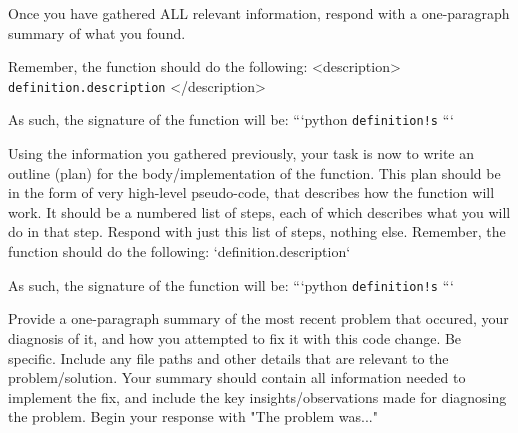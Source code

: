 \begin{tcolorbox}[title={\texttt{Explore Repository User Instructions}}]
Once you have gathered ALL relevant information, respond with a one-paragraph summary of what you found.

Remember, the function should do the following:
<description>
\texttt{{definition.description}}
</description>

As such, the signature of the function will be:
```python
\texttt{{definition!s}}
```
\end{tcolorbox}

\begin{tcolorbox}[title={\texttt{Explore Repository User Instructions}}]
Using the information you gathered previously, your task is now to write an outline (plan) for the body/implementation of the function. 
    This plan should be in the form of very high-level pseudo-code, that describes how the function will work.
    It should be a numbered list of steps, each of which describes what you will do in that step.
    Respond with just this list of steps, nothing else.
    Remember, the function should do the following: `{definition.description}`
    
    As such, the signature of the function will be:
    ```python
    \texttt{{definition!s}}
    ```
\end{tcolorbox}

\begin{tcolorbox}[title={\texttt{Summarize Problem User Instructions}}]
Provide a one-paragraph summary of the most recent problem that occured, your diagnosis of it, and how you attempted to fix it with this code change. 
Be specific. 
Include any file paths and other details that are relevant to the problem/solution. 
Your summary should contain all information needed to implement the fix, and include the key insights/observations made for diagnosing the problem.
Begin your response with "The problem was..."
\end{tcolorbox}



